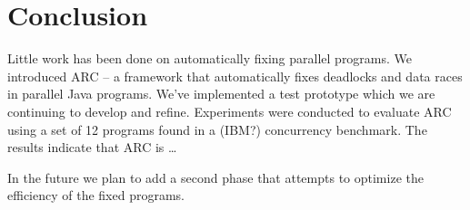 \section{Conclusion}
\label{sec:conclusion}

Little work has been done on automatically fixing parallel programs. We
introduced ARC -- a framework that automatically fixes deadlocks and data races
in parallel Java programs. We've implemented a test prototype which we are
continuing to develop and refine.  Experiments were conducted to evaluate ARC
using a set of 12 programs found in a (IBM?) concurrency benchmark. The results
indicate that ARC is \ldots

In the future we plan to add a second phase that attempts to optimize the
efficiency of the fixed programs.


